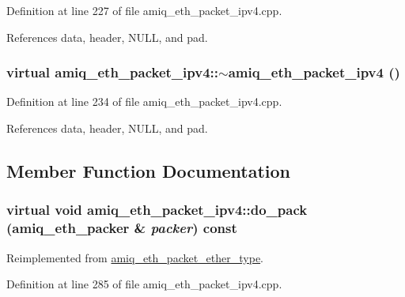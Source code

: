 Definition at line 227 of file amiq\_\-eth\_\-packet\_\-ipv4.cpp.

References data, header, NULL, and pad.\hypertarget{classamiq__eth__packet__ipv4_abfc12e657f4ec983b98868e43da66977}{
\subsubsection[{$\sim$amiq\_\-eth\_\-packet\_\-ipv4}]{\setlength{\rightskip}{0pt plus 5cm}virtual amiq\_\-eth\_\-packet\_\-ipv4::$\sim$amiq\_\-eth\_\-packet\_\-ipv4 ()}}
\label{classamiq__eth__packet__ipv4_abfc12e657f4ec983b98868e43da66977}


Definition at line 234 of file amiq\_\-eth\_\-packet\_\-ipv4.cpp.

References data, header, NULL, and pad.

\subsection{Member Function Documentation}
\hypertarget{classamiq__eth__packet__ipv4_a8130e24da66bbd16c4edc7b6a608a5e9}{
\subsubsection[{do\_\-pack}]{\setlength{\rightskip}{0pt plus 5cm}virtual void amiq\_\-eth\_\-packet\_\-ipv4::do\_\-pack ({\bf amiq\_\-eth\_\-packer} \& {\em packer}) const}}
\label{classamiq__eth__packet__ipv4_a8130e24da66bbd16c4edc7b6a608a5e9}


Reimplemented from \hyperlink{classamiq__eth__packet__ether__type_a62fe5f26a466f0bd0045599b89aa6926}{amiq\_\-eth\_\-packet\_\-ether\_\-type}.

Definition at line 285 of file amiq\_\-eth\_\-packet\_\-ipv4.cpp.

